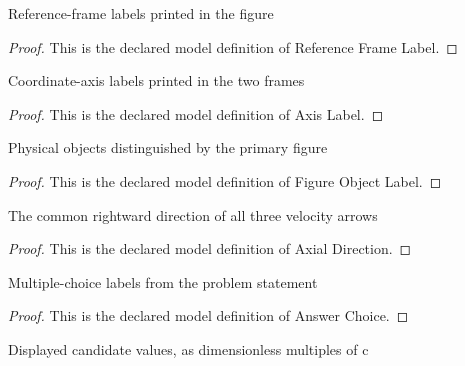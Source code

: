 \begin{definition}
  \label{def:physics:phyx-mini-0510:phyxminiproblems-problemphyxmini0510-referenceframelabel}
  Reference-frame labels printed in the figure
\end{definition}
\begin{proof}
  This is the declared model definition of Reference Frame Label.
\end{proof}
\begin{definition}
  \label{def:physics:phyx-mini-0510:phyxminiproblems-problemphyxmini0510-axislabel}
  Coordinate-axis labels printed in the two frames
\end{definition}
\begin{proof}
  This is the declared model definition of Axis Label.
\end{proof}
\begin{definition}
  \label{def:physics:phyx-mini-0510:phyxminiproblems-problemphyxmini0510-figureobjectlabel}
  Physical objects distinguished by the primary figure
\end{definition}
\begin{proof}
  This is the declared model definition of Figure Object Label.
\end{proof}
\begin{definition}
  \label{def:physics:phyx-mini-0510:phyxminiproblems-problemphyxmini0510-axialdirection}
  The common rightward direction of all three velocity arrows
\end{definition}
\begin{proof}
  This is the declared model definition of Axial Direction.
\end{proof}
\begin{definition}
  \label{def:physics:phyx-mini-0510:phyxminiproblems-problemphyxmini0510-answerchoice}
  Multiple-choice labels from the problem statement
\end{definition}
\begin{proof}
  This is the declared model definition of Answer Choice.
\end{proof}
\begin{definition}
  \label{def:physics:phyx-mini-0510:phyxminiproblems-problemphyxmini0510-answerchoiceinlightspeedunits}
  Displayed candidate values, as dimensionless multiples of c
\end{definition}

